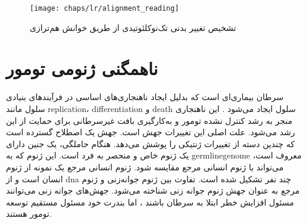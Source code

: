 \begin{figure}[!ht]
	\centerline{\texttt{[image: chaps/lr/alignment\_reading]}}
	\caption{تشخیص تغییر بدنی تک‌نوکلئوتیدی از طریق خوانش هم‌ترازی}
	\label{fig:ch_lr:alignment_reading}
\end{figure}



\section{ناهمگنی ژنومی تومور}

سرطان بیماری‌ای است که بدلیل ایجاد ناهنجاری‌های اساسی در فرآیند‌های بنیادی سلول مانند \gls{replication}، \gls{differentiation}  و \gls{death} سلول  ایجاد می‌شود \cite{hanahan2011hallmarks}. این ناهنجاری منجر به رشد کنترل نشده تومور و به‌کارگیری بافت غیرسرطانی برای حمایت از این رشد می‌شود. علت اصلی این تغییرات جهش است. جهش یک اصطلاح گسترده است که چندین دسته از تغییرات ژنتیکی را پوشش می‌دهد. هنگام حاملگی، یک جنین دارای یک ژنوم خاص و منحصر به فرد است. این ژنوم که به \gls{germlinegenome} معروف است، می‌تواند با ژنوم انسانی مرجع مقایسه شود. ژنوم انسانی مرجع یک نمونه از ژنوم انسان است و از \gls{dna} چند نفر تشکیل شده است. تفاوت بین ژنوم جوانه‌زنی و ژنوم مرجع به عنوان جهش ژنوم جوانه زنی شناخته می‌شود. جهش‌های جوانه زنی می‌توانند مسئول افزایش خطر ابتلا به سرطان باشند \cite{stewart2017world}، اما بندرت خود مسئول مستقیم توسعه تومور هستند. 




